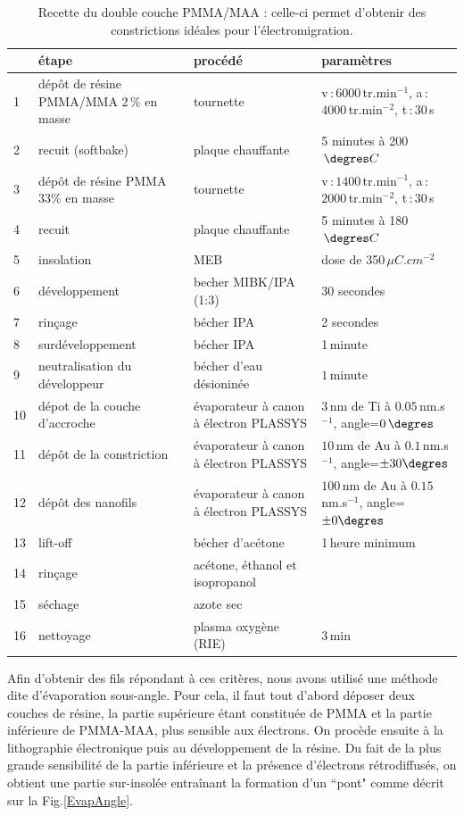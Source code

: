 \begin{table}
\begin{center}
\begin{tabular}{|p{0.5cm}|p{4cm}|p{4cm}|p{3cm}|}
  \hline
\,& \textbf{étape} & \textbf{procédé} & \textbf{paramètres} \tabularnewline
\hline
1 &  dép\^ot de résine PMMA/MMA 2\,\% en masse & tournette & v\,:\,$6000\,$tr.min$^{-1}$, a\,:\,$4000\,$tr.min$^{-2}$, t\,:\,$30\,$s 
\tabularnewline
\hline
 2 & recuit (softbake) & plaque chauffante  & 5 minutes à 200$\, \degres C$ 
\tabularnewline
\hline
 3 & dépôt de résine PMMA 33\% en masse & tournette & v\,:\,$1400\,$tr.min$^{-1}$, a\,:\,$2000\,$tr.min$^{-2}$, t\,:\,$30\,$s \tabularnewline
\hline
4 & recuit & plaque chauffante & 5 minutes à 180$\, \degres C$
\tabularnewline
\hline
5 & insolation & MEB & dose de 350\,$\mu C.cm^{-2}$
\tabularnewline
\hline
6 & développement & becher MIBK/IPA (1:3) & 30 secondes
\tabularnewline
\hline
7 & rinçage & bécher IPA & 2 secondes
\tabularnewline
\hline
8 & surdéveloppement & bécher IPA & 1\,minute
\tabularnewline
\hline
9 & neutralisation du développeur &bécher d'eau désioninée & $1\,$minute\tabularnewline
\hline
10 & dépot de la couche d'accroche & évaporateur à canon à électron PLASSYS & $3\,$nm de Ti à $0.05\,$nm.s$^{-1}$, angle=$0\,\degres$
\tabularnewline
\hline
11 & dépôt de la constriction & évaporateur à canon à électron PLASSYS & $10\,$nm de Au à $0.1\,$nm.s$^{-1}$, angle=$\pm 30\degres$
\tabularnewline
\hline
12 &  dépôt des nanofils &  évaporateur à canon à électron PLASSYS  &  $100\,$nm de Au à $0.15\,$nm.s$^{-1}$, angle=$\pm 0\degres$
\tabularnewline
\hline
 13 & lift-off & bécher d'acétone & 1\,heure minimum 
\tabularnewline
\hline
14 & rinçage & acétone, éthanol et isopropanol & 
\tabularnewline
\hline
15 & séchage & azote sec & 
\tabularnewline
\hline
16 & nettoyage & plasma oxygène (RIE)& $3\,$min\tabularnewline
\hline
\end{tabular}
\caption{Recette du double couche PMMA/MAA : celle-ci permet d'obtenir des constrictions idéales pour l'électromigration.}
\label{tab_recette_elec}
\end{center}
\end{table}


Afin d'obtenir des fils répondant à ces critères, nous avons utilisé une méthode dite d'évaporation sous-angle. Pour cela, il faut tout d'abord déposer deux couches de résine, la partie supérieure étant constituée de PMMA et la partie inférieure de PMMA-MAA, plus sensible aux électrons. On procède ensuite à la lithographie électronique puis au développement de la résine. Du fait de la plus grande sensibilité de la partie inférieure et la présence d'électrons rétrodiffusés, on obtient une partie sur-insolée entraînant la formation d'un ``pont" comme décrit sur la Fig.\ref{EvapAngle}.

